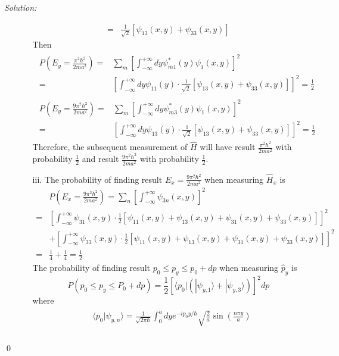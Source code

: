 \documentclass[12pt,a4paper]{article}
\newenvironment{sol}
    {\emph{Solution:}
    }
    {
    \qed
    }
\begin{document}
\begin{sol}
\begin{itemize}
\begin{itemize}
\begin{align}
=&\frac{1}{\sqrt{2}}[\psi_{13}(x,y)+\psi_{33}(x,y)]
\end{align}
Then
\begin{gather}
\begin{align}
\nonumber P(E_y=\frac{\pi^2\hbar^2}{2ma^2})=&\sum_{m}\left[\int_{-\infty}^{+\infty}dy\psi_{m1}^*(y)\psi_1(x,y)\right]^2\\
=&\left[\int_{-\infty}^{+\infty}dy\psi_{11}(y)\cdot\frac{1}{\sqrt{2}}[\psi_{13}(x,y)+\psi_{33}(x,y)]\right]^2=\frac{1}{2}
\end{align}\\
\begin{align}
\nonumber P(E_y=\frac{9\pi^2\hbar^2}{2ma^2})=&\sum_{m}\left[\int_{-\infty}^{+\infty}dy\psi_{m3}^*(y)\psi_1(x,y)\right]^2\\
=&\left[\int_{-\infty}^{+\infty}dy\psi_{13}(y)\cdot\frac{1}{\sqrt{2}}[\psi_{13}(x,y)+\psi_{33}(x,y)]\right]^2=\frac{1}{2}
\end{align}
\end{gather}
Therefore, the subsequent measurement of $\hat{H}$ will have result $\frac{\pi^2\hbar^2}{2ma^2}$ with probability $\frac{1}{2}$ and result $\frac{9\pi^2\hbar^2}{2ma^2}$ with probability $\frac{1}{2}$.
\item[iii.] The probability of finding result $E_x=\frac{9\pi^2\hbar^2}{2ma^2}$ when measuring $\hat{H}_x$ is
\begin{align}
\nonumber&P\left(E_x=\frac{9\pi^2\hbar^2}{2ma^2}\right)=\sum_{n}\left[\int_{-\infty}^{+\infty}\psi_{3n}(x,y)\right]^2\\
\nonumber=&\left[\int_{-\infty}^{+\infty}\psi_{31}(x,y)\cdot\frac{1}{2}[\psi_{11}(x,y)+\psi_{13}(x,y)+\psi_{31}(x,y)+\psi_{33}(x,y)]\right]^2\\
\nonumber&+\left[\int_{-\infty}^{+\infty}\psi_{33}(x,y)\cdot\frac{1}{2}[\psi_{11}(x,y)+\psi_{13}(x,y)+\psi_{31}(x,y)+\psi_{33}(x,y)]\right]^2\\
=&\frac{1}{4}+\frac{1}{4}=\frac{1}{2}
\end{align}
The probability of finding result $p_0\leq p_y\leq p_0+dp$ when measuring $\hat{p}_y$ is
\begin{equation}
P(p_0\leq p_y\leq P_0+dp)=\frac{1}{2}[\langle p_0|(|\psi_{y,1}\rangle+|\psi_{y,3}\rangle)]^2dp
\end{equation}
where
\footnotesize\begin{gather}
\begin{align}
\nonumber&\langle p_0|\psi_{y,n}\rangle=\frac{1}{\sqrt{2\pi\hbar}}\int_0^adye^{-ip_0y/\hbar}\sqrt{\frac{2}{a}}\sin\left(\frac{n\pi y}{a}\right)\\

\end{align}
\end{gather}
\end{itemize}
\end{itemize}
\end{sol}
\end{document}
